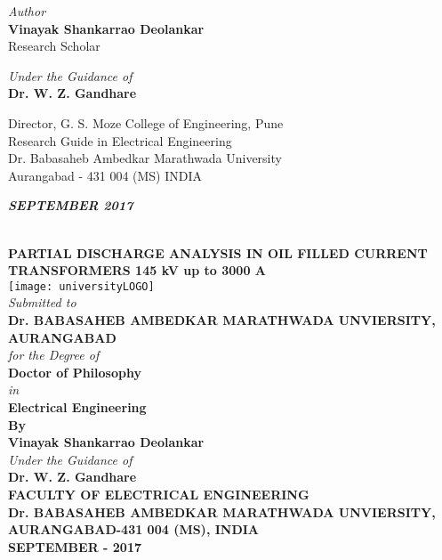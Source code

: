 \textit{\small Author}\\
\textcolor{ured}{\textbf{\large Vinayak Shankarrao Deolankar}}\\
\small Research Scholar
\vspace{3cm}

\textit{\small Under the Guidance of}\\
\textcolor{ured}{\textbf{\large Dr. W. Z. Gandhare}}\\
\vspace{0.5cm}

\small Director, G. S. Moze College of Engineering, Pune\\
\small Research Guide in Electrical Engineering\\
\small Dr. Babasaheb Ambedkar Marathwada University\\
\small Aurangabad - 431 004 (MS) INDIA
\vspace{2cm}

\textbf{\textit{\large SEPTEMBER 2017}}
\clearpage
\begin{center}
~\\
\textbf{\large PARTIAL DISCHARGE ANALYSIS IN OIL FILLED CURRENT TRANSFORMERS 145 kV up to 3000 A}\\
\vspace{0.5cm}
\texttt{[image: universityLOGO]}\\
\vspace{0.8cm}
\textit{\normalsize Submitted to}\\
\textbf{\large Dr. BABASAHEB AMBEDKAR MARATHWADA UNVIERSITY, AURANGABAD}\\
\vspace{1cm}
\textit{\normalsize for the Degree of}\\
\textbf{\normalsize Doctor of Philosophy}\\
\textit{\normalsize in} \\
\textbf{\normalsize Electrical Engineering}\\
\textbf{\small By}\\
\textbf{\large Vinayak Shankarrao Deolankar}\\
\textit{\normalsize Under the Guidance of}\\
\textbf{\large Dr. W. Z. Gandhare}\\
\vspace{1cm}
\textbf{\large FACULTY OF ELECTRICAL ENGINEERING}\\
\textbf{\large Dr. BABASAHEB AMBEDKAR MARATHWADA UNVIERSITY, AURANGABAD-431 004 (MS), INDIA\\
SEPTEMBER - 2017}
\end{center}
\clearpage

